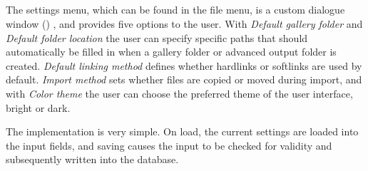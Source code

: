 \subsection{}
\def\kapitelautor{Erik Ritschl}

The settings menu, which can be found in the file menu, is a custom dialogue window () \cite{wxDialogue}, and provides five options to the user. With \emph{Default gallery folder} and \emph{Default folder location} the user can specify specific paths that should automatically be filled in when a gallery folder or advanced output folder is created. \emph{Default linking method} defines whether hardlinks or softlinks are used by default. \emph{Import method} sets whether files are copied or moved during import, and with \emph{Color theme} the user can choose the preferred theme of the user interface, bright or dark.

The implementation is very simple. On load, the current settings are loaded into the input fields, and saving causes the input to be checked for validity and subsequently written into the database.